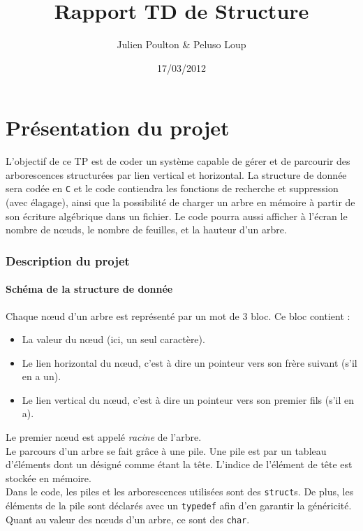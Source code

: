 \documentclass[a4paper,11pt] {article}
\title{Rapport TD de Structure}
\author{Julien Poulton & Peluso Loup}
\date{17/03/2012}
\begin{document}
\part{Présentation du projet}

  L'objectif de ce TP est de coder un système capable de gérer et de parcourir des arborescences structurées par lien vertical et horizontal. La structure de donnée sera codée en \verb?C? et le code contiendra les fonctions de recherche et suppression (avec élagage), ainsi que la possibilité de charger un arbre en mémoire à partir de son écriture algébrique dans un fichier. Le code pourra aussi afficher à l'écran le nombre de nœuds, le nombre de feuilles, et la hauteur d'un arbre.

\section{Description du projet}

\subsection{Schéma de la structure de donnée}

Chaque nœud d'un arbre est représenté par un mot de 3 bloc. Ce bloc contient :

\vspace{0.5cm}
	
\begin{itemize}
\item La valeur du nœud (ici, un seul caractère).
\item Le lien horizontal du nœud, c'est à dire un pointeur vers son frère suivant (s'il en a un).
\item Le lien vertical du nœud, c'est à dire un pointeur vers son premier fils (s'il en a).
\end{itemize}

\vspace{0.5cm}

Le premier nœud est appelé \emph{racine} de l'arbre.\\

Le parcours d'un arbre se fait grâce à une pile. Une pile est par un tableau d'éléments dont un désigné comme étant la tête. L'indice de l'élément de tête est stockée en mémoire.\\

Dans le code, les piles et les arborescences utilisées sont des \verb#struct#s. De plus, les éléments de la pile sont déclarés avec un \verb#typedef# afin d'en garantir la généricité.
%
%
Quant au valeur des nœuds d'un arbre, ce sont des \verb?char?.
%
\end{document}
